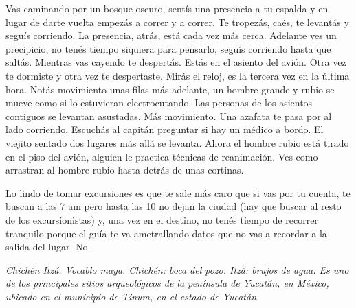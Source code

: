 \documentclass[12pt,twoside,openright,a5paper]{book}
\begin{document}
\afterpage{}
\vspace{0.5cm}
\hrulefill\hspace{0.2cm} \decofourleft\decofourright \hspace{0.2cm} \hrulefill
\vspace{0.5cm}

Vas caminando por un bosque oscuro, sentís una presencia a tu espalda
y en lugar de darte vuelta empezás a correr y a correr. Te tropezás,
caés, te levantás y seguís corriendo. La presencia, atrás, está cada vez
más cerca. Adelante ves un precipicio, no tenés tiempo siquiera
para pensarlo, seguís corriendo hasta que saltás. Mientras vas cayendo te
despertás. Estás en el asiento del avión. Otra vez te dormiste y otra vez
te despertaste. Mirás el reloj, es la tercera vez en la última hora. Notás
movimiento unas filas más adelante, un hombre grande y rubio se mueve  como
si lo estuvieran electrocutando. Las personas de los asientos contiguos
se levantan asustadas. Más movimiento. Una azafata te pasa por al lado
corriendo. Escuchás al capitán preguntar si hay un médico a bordo. El
viejito sentado dos lugares más allá se levanta. Ahora el hombre rubio
está tirado en el piso del avión, alguien le practica técnicas de
reanimación. Ves como arrastran al hombre rubio hasta detrás de
unas cortinas.


\vspace{0.5cm}
\hrulefill\hspace{0.2cm} \decofourleft\decofourright \hspace{0.2cm} \hrulefill
\vspace{0.5cm}

Lo lindo de tomar excursiones es que te sale más caro que si vas por tu
cuenta, te buscan a las 7 am pero hasta las 10 no dejan la ciudad (hay que
buscar al resto de los excursionistas) y, una vez en el destino, no tenés
tiempo de recorrer tranquilo porque el guía te va ametrallando datos que
no vas a recordar a la salida del lugar. No.


\vspace{0.5cm}
\hrulefill\hspace{0.2cm} \decofourleft\decofourright \hspace{0.2cm} \hrulefill
\vspace{0.5cm}

\emph{Chichén Itzá. Vocablo maya. Chichén: boca del pozo. Itzá: brujos de agua.
Es uno de los principales sitios arqueológicos de la península de Yucatán,
en México, ubicado en el municipio de Tinum, en el estado de Yucatán.}
\end{document}

